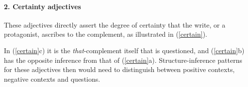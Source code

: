 \documentclass[10pt]{article}
\begin{document}


\vspace{-1.0em}
\paragraph{2. Certainty  adjectives} These adjectives directly assert the degree of certainty that the write, or a protagonist, ascribes to the complement, as illustrated in (\ref{certain}).

\vspace{-0.5em}
 \vspace{-0.5em} In (\ref{certain}c) it is the
 \textit{that}-complement itself that is questioned, and
 (\ref{certain}b) has the opposite inference from that of
 (\ref{certain}a).  Structure-inference patterns for these adjectives
 then would need to distinguish between positive contexts, negative
 contexts and questions.
\end{document}
